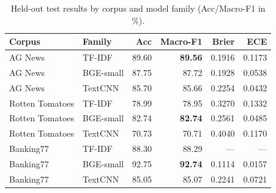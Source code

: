 \begin{table}[H]
\centering
\caption{Held-out test results by corpus and model family (Acc/Macro-F1 in \%).}
\small
\begin{tabular}{@{}llrrrr@{}}
\toprule
Corpus & Family & Acc & Macro-F1 & Brier & ECE \\
\midrule
AG News & TF-IDF & 89.60 & \textbf{89.56} & 0.1916 & 0.1173 \\
AG News & BGE-small & 87.75 & 87.72 & 0.1928 & 0.0538 \\
AG News & TextCNN & 85.70 & 85.66 & 0.2254 & 0.0432 \\
Rotten Tomatoes & TF-IDF & 78.99 & 78.95 & 0.3270 & 0.1332 \\
Rotten Tomatoes & BGE-small & 82.74 & \textbf{82.74} & 0.2561 & 0.0485 \\
Rotten Tomatoes & TextCNN & 70.73 & 70.71 & 0.4040 & 0.1170 \\
Banking77 & TF-IDF & 88.30 & 88.29 & --- & --- \\
Banking77 & BGE-small & 92.75 & \textbf{92.74} & 0.1114 & 0.0157 \\
Banking77 & TextCNN & 85.05 & 85.07 & 0.2241 & 0.0721 \\
\bottomrule
\end{tabular}
\end{table}

